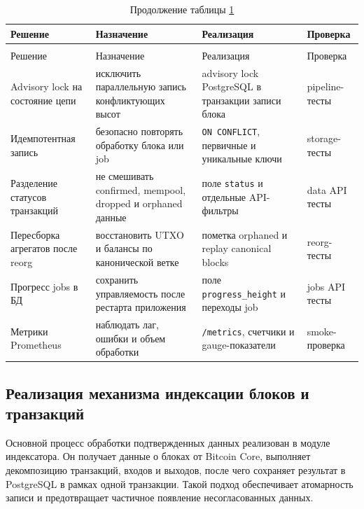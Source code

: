 \begin{footnotesize}
\setlength{\tabcolsep}{3pt}
\begin{longtable}{|p{}|p{}|p{}|p{}|}
    \caption{Ключевые инженерные решения реализации}\label{tab:implementation-decisions}\\ \hline
    Решение & Назначение & Реализация & Проверка \\ \hline
    \endfirsthead
    \caption*{Продолжение таблицы \ref{tab:implementation-decisions}}\\ \hline
    Решение & Назначение & Реализация & Проверка \\ \hline
    \endhead
    \hline
    \endfoot
    \hline
    \endlastfoot
    Advisory lock на состояние цепи &
    исключить параллельную запись конфликтующих высот &
    advisory lock PostgreSQL в транзакции записи блока &
    pipeline-тесты \\ \hline
    Идемпотентная запись &
    безопасно повторять обработку блока или job &
    \texttt{ON CONFLICT}, первичные и уникальные ключи &
    storage-тесты \\ \hline
    Разделение статусов транзакций &
    не смешивать confirmed, mempool, dropped и orphaned данные &
    поле \texttt{status} и отдельные API-фильтры &
    data API тесты \\ \hline
    Пересборка агрегатов после reorg &
    восстановить UTXO и балансы по канонической ветке &
    пометка orphaned и replay canonical blocks &
    reorg-тесты \\ \hline
    Прогресс jobs в БД &
    сохранить управляемость после рестарта приложения &
    поле \texttt{progress\_height} и переходы job &
    jobs API тесты \\ \hline
    Метрики Prometheus &
    наблюдать лаг, ошибки и объем обработки &
    \texttt{/metrics}, счетчики и gauge-показатели &
    smoke-проверка \\ \hline
\end{longtable}
\end{footnotesize}

\subsection{Реализация механизма индексации блоков и транзакций}

Основной процесс обработки подтвержденных данных реализован в модуле
индексатора.
Он получает данные о блоках от Bitcoin Core, выполняет декомпозицию транзакций,
входов и выходов, после чего сохраняет результат в PostgreSQL в рамках одной
транзакции. Такой подход обеспечивает атомарность записи и предотвращает
частичное появление несогласованных данных.

